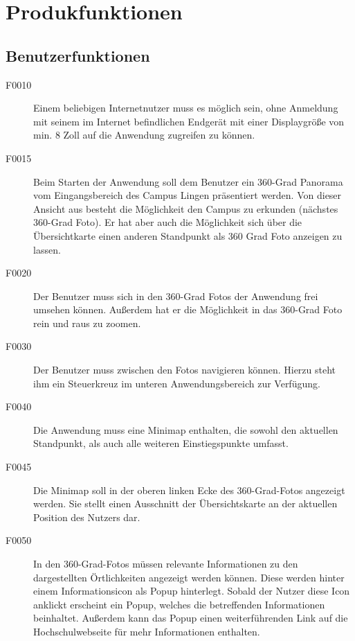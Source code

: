 \section{Produkfunktionen}
\label{sec:Produkfunktionen}

\subsection{Benutzerfunktionen}
\label{sec:Benutzerfunktionen}

\begin{description}
  \item[F0010] Einem beliebigen Internetnutzer muss es möglich sein, ohne Anmeldung mit seinem
  im Internet befindlichen Endgerät mit einer Displaygröße von min. 8 Zoll auf die
  Anwendung zugreifen zu können.
  \item[F0015] Beim Starten der Anwendung soll dem Benutzer ein 360-Grad Panorama vom
  Eingangsbereich des Campus Lingen präsentiert werden. Von dieser Ansicht aus
  besteht die Möglichkeit den Campus zu erkunden (nächstes 360-Grad Foto). Er hat
  aber auch die Möglichkeit sich über die Übersichtkarte einen anderen Standpunkt
  als 360 Grad Foto anzeigen zu lassen.
  \item[F0020] Der Benutzer muss sich in den 360-Grad Fotos der Anwendung frei umsehen können. Außerdem hat er die Möglichkeit in das 360-Grad Foto rein und raus zu zoomen.
  \item[F0030] Der Benutzer muss zwischen den Fotos navigieren können. Hierzu steht ihm ein
  Steuerkreuz im unteren Anwendungsbereich zur Verfügung.
  \item[F0040] Die Anwendung muss eine Minimap enthalten, die sowohl den aktuellen Standpunkt, als auch alle weiteren Einstiegspunkte umfasst.
  \item[F0045] Die Minimap soll in der oberen linken Ecke des 360-Grad-Fotos angezeigt werden.
  Sie stellt einen Ausschnitt der Übersichtskarte an der aktuellen Position des Nutzers
  dar.
  \item[F0050] In den 360-Grad-Fotos müssen relevante Informationen zu den dargestellten Örtlichkeiten angezeigt werden können. Diese werden hinter einem Informationsicon als
  Popup hinterlegt. Sobald der Nutzer diese Icon anklickt erscheint ein Popup, welches die betreffenden Informationen beinhaltet. Außerdem kann das Popup einen
  weiterführenden Link auf die Hochschulwebseite für mehr Informationen enthalten.
\end{description}

